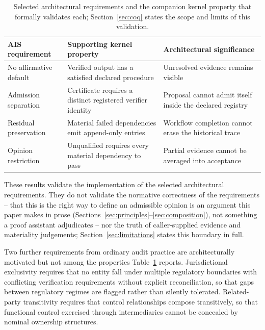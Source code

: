 \documentclass[11pt,a4paper]{article}
\theoremstyle{definition}
\theoremstyle{remark}
\begin{document}
\begin{table}[htbp]
\centering
\small
\begin{tabular}{>{\raggedright\arraybackslash}p{2.6cm}>{\raggedright\arraybackslash}p{4.8cm}>{\raggedright\arraybackslash}p{4.6cm}}
\toprule
\textbf{AIS requirement} & \textbf{Supporting kernel property} & \textbf{Architectural significance} \\
\midrule
No affirmative default & Verified output has a satisfied declared procedure & Unresolved evidence remains visible \\
\addlinespace
Admission separation & Certificate requires a distinct registered verifier identity & Proposal cannot admit itself inside the declared registry \\
\addlinespace
Residual preservation & Material failed dependencies emit append-only entries & Workflow completion cannot erase the historical trace \\
\addlinespace
Opinion restriction & \textsf{Unqualified} requires every material dependency to pass & Partial evidence cannot be averaged into acceptance \\
\bottomrule
\end{tabular}
\caption{Selected architectural requirements and the companion kernel property that formally validates each; Section~\ref{sec:coq} states the scope and limits of this validation.}
\label{tab:validation}
\end{table}

These results validate the implementation of the selected architectural requirements. They do not validate the normative correctness of the requirements -- that this is the right way to define an admissible opinion is an argument this paper makes in prose (Sections~\ref{sec:principles}--\ref{sec:composition}), not something a proof assistant adjudicates -- nor the truth of caller-supplied evidence and materiality judgements; Section~\ref{sec:limitations} states this boundary in full.

Two further requirements from ordinary audit practice are architecturally motivated but not among the properties Table~\ref{tab:validation} reports. Jurisdictional exclusivity requires that no entity fall under multiple regulatory boundaries with conflicting verification requirements without explicit reconciliation, so that gaps between regulatory regimes are flagged rather than silently tolerated. Related-party transitivity requires that control relationships compose transitively, so that functional control exercised through intermediaries cannot be concealed by nominal ownership structures.
\end{document}
